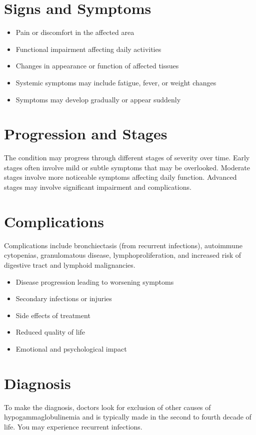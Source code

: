 \section{Signs and Symptoms}
\begin{itemize}[noitemsep]
  \item Pain or discomfort in the affected area
  \item Functional impairment affecting daily activities
  \item Changes in appearance or function of affected tissues
  \item Systemic symptoms may include fatigue, fever, or weight changes
  \item Symptoms may develop gradually or appear suddenly
\end{itemize}
\section{Progression and Stages}
The condition may progress through different stages of severity over time. Early stages often involve mild or subtle symptoms that may be overlooked. Moderate stages involve more noticeable symptoms affecting daily function. Advanced stages may involve significant impairment and complications.
\section{Complications}
Complications include bronchiectasis (from recurrent infections), autoimmune cytopenias, granulomatous disease, lymphoproliferation, and increased risk of digestive tract and lymphoid malignancies.

\begin{itemize}[noitemsep]
  \item Disease progression leading to worsening symptoms
  \item Secondary infections or injuries
  \item Side effects of treatment
  \item Reduced quality of life
  \item Emotional and psychological impact
\end{itemize}
\section{Diagnosis}
To make the diagnosis, doctors look for exclusion of other causes of hypogammaglobulinemia and is typically made in the second to fourth decade of life. You may experience recurrent infections.

